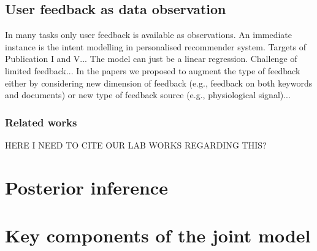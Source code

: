 \documentclass[dissertation,math,vertlayout,pdfa,colorlinks]{aaltoseries}
\begin{document}
\subsection{User feedback as data observation} 
In many tasks only user feedback is available as observations. An immediate instance is the intent modelling in personalised recommender system. Targets of Publication I and V... The model can just be a linear regression. Challenge of limited feedback... In the papers we proposed to augment the type of feedback either by considering new dimension of feedback (e.g., feedback on both keywords and documents) or new type of feedback source (e.g., physiological signal)...



\subsubsection{Related works}
HERE I NEED TO CITE OUR LAB WORKS REGARDING THIS?

\section{Posterior inference} \label{posteriro_inf}


\section{Key components of the joint model}\label{key_comp}




\end{document}
